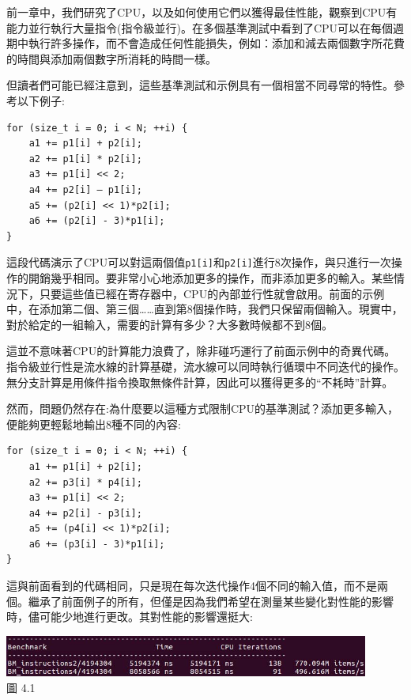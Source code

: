 
前一章中，我們研究了CPU，以及如何使用它們以獲得最佳性能，觀察到CPU有能力並行執行大量指令(指令級並行)。在多個基準測試中看到了CPU可以在每個週期中執行許多操作，而不會造成任何性能損失，例如：添加和減去兩個數字所花費的時間與添加兩個數字所消耗的時間一樣。

但讀者們可能已經注意到，這些基準測試和示例具有一個相當不同尋常的特性。參考以下例子:

\begin{lstlisting}[style=styleCXX]
for (size_t i = 0; i < N; ++i) {
	a1 += p1[i] + p2[i];
	a2 += p1[i] * p2[i];
	a3 += p1[i] << 2;
	a4 += p2[i] – p1[i];
	a5 += (p2[i] << 1)*p2[i];
	a6 += (p2[i] - 3)*p1[i];
}
\end{lstlisting}

這段代碼演示了CPU可以對這兩個值\texttt{p1[i]}和\texttt{p2[i]}進行8次操作，與只進行一次操作的開銷幾乎相同。要非常小心地添加更多的操作，而非添加更多的輸入。某些情況下，只要這些值已經在寄存器中，CPU的內部並行性就會啟用。前面的示例中，在添加第二個、第三個……直到第8個操作時，我們只保留兩個輸入。現實中，對於給定的一組輸入，需要的計算有多少？大多數時候都不到8個。

這並不意味著CPU的計算能力浪費了，除非碰巧運行了前面示例中的奇異代碼。指令級並行性是流水線的計算基礎，流水線可以同時執行循環中不同迭代的操作。無分支計算是用條件指令換取無條件計算，因此可以獲得更多的“不耗時”計算。

然而，問題仍然存在:為什麼要以這種方式限制CPU的基準測試？添加更多輸入，便能夠更輕鬆地輸出8種不同的內容:

\begin{lstlisting}[style=styleCXX]
for (size_t i = 0; i < N; ++i) {
	a1 += p1[i] + p2[i];
	a2 += p3[i] * p4[i];
	a3 += p1[i] << 2;
	a4 += p2[i] - p3[i];
	a5 += (p4[i] << 1)*p2[i];
	a6 += (p3[i] - 3)*p1[i];
}
\end{lstlisting}

這與前面看到的代碼相同，只是現在每次迭代操作4個不同的輸入值，而不是兩個。繼承了前面例子的所有，但僅是因為我們希望在測量某些變化對性能的影響時，儘可能少地進行更改。其對性能的影響還挺大:

\begin{center}
\includegraphics[width=0.9\textwidth]{content/1/chapter4/images/1.jpg}\\
圖 4.1
\end{center}

